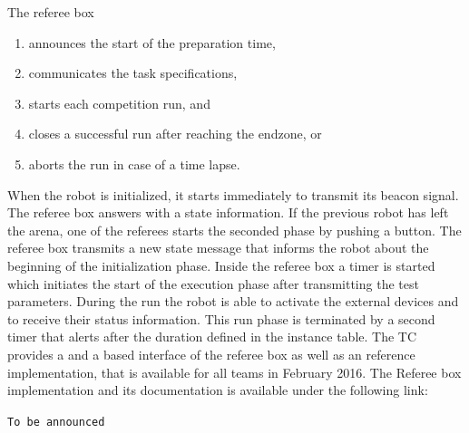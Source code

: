 The referee box
\begin{enumerate}
  \item announces the start of the preparation time,
  \item communicates the task specifications,
  \item starts each competition run, and
  \item closes a successful run after reaching the endzone, or
  \item aborts the run in case of a time lapse.
\end{enumerate}

When the robot is initialized, it starts immediately to transmit its beacon 
signal. The referee box answers with a state information. If the previous robot 
has left the arena, one of the referees starts the seconded phase by pushing a 
button. The referee box transmits a new state message that informs the robot 
about the beginning of the initialization phase. Inside the referee box a 
timer is started which initiates the start of the execution phase after 
transmitting the test parameters. During the run the robot is able to activate 
the external devices and to receive their status information. This run phase is 
terminated by a second timer that alerts after the duration defined in the 
instance table.
% 
% 
The TC provides a  and a  based interface of the referee box as well as 
an reference implementation, that is available for all teams in February 2016.
The Referee box implementation and its documentation is available under the following link:
\begin{center}
	\texttt{To be announced} 
\end{center}




